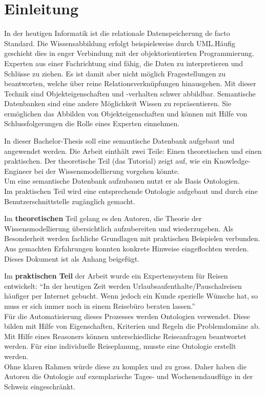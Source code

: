 \chapter{Einleitung}
\label{chap:einleitung}


In der heutigen Informatik ist die relationale Datenspeicherung de facto Standard. Die Wissensabbildung erfolgt beispielsweise durch UML.\@ Häufig geschieht dies in enger Verbindung mit der objektorientierten Programmierung. Experten aus einer Fachrichtung sind fähig, die Daten zu interpretieren und Schlüsse zu ziehen. Es ist damit aber nicht möglich Fragestellungen zu beantworten, welche über reine Relationsverknüpfungen hinausgehen. Mit dieser Technik sind Objekteigenschaften und -verhalten schwer abbildbar. Semantische Datenbanken sind eine andere Möglichkeit Wissen zu repräsentieren. Sie ermöglichen das Abbilden von Objekteigenschaften und können mit Hilfe von Schlussfolgerungen die Rolle eines Experten einnehmen.

In dieser Bachelor-Thesis soll eine semantische Datenbank aufgebaut und angewendet werden.  Die Arbeit einthält zwei Teile: Einen theoretischen und einen praktischen. Der theoretische Teil (das Tutorial) zeigt auf, wie ein Knowledge-Engineer bei der Wissensmodellierung vorgehen könnte.\\
Um eine semantische Datenbank aufzubauen nutzt er als Basis Ontologien.\\
Im praktischen Teil wird eine entsprechende Ontologie aufgebaut und durch eine Benutzerschnittstelle zugänglich gemacht.

Im \textbf{theoretischen} Teil gelang es den Autoren, die Theorie der Wissensmodellierung übersichtlich aufzubereiten und wiederzugeben. Als Besonderheit werden fachliche Grundlagen mit praktischen Beispielen verbunden. Aus gemachten Erfahrungen konnten konkrete Hinweise eingeflochten werden. Dieses Dokument ist als Anhang beigefügt.

Im \textbf{praktischen Teil} der Arbeit wurde ein Expertensystem für Reisen entwickelt: ``In der heutigen Zeit werden Urlaubsaufenthalte/Pauschalreisen häufiger per Internet gebucht. Wenn jedoch ein Kunde spezielle Wünsche hat, so muss er sich immer noch in einem Reisebüro beraten lassen.''\\
Für die Automatisierung dieses Prozesses werden Ontologien verwendet. Diese bilden mit Hilfe von Eigenschaften, Kriterien und Regeln die Problemdomäne ab. Mit Hilfe eines Reasoners können unterschiedliche Reiseanfragen beantwortet werden. Für eine individuelle Reiseplanung, musste eine Ontologie erstellt werden.\\
Ohne klaren Rahmen würde diese zu komplex und zu gross. Daher haben die Autoren die Ontologie auf exemplarische Tages- und Wochenendausflüge in der Schweiz eingeschränkt.

